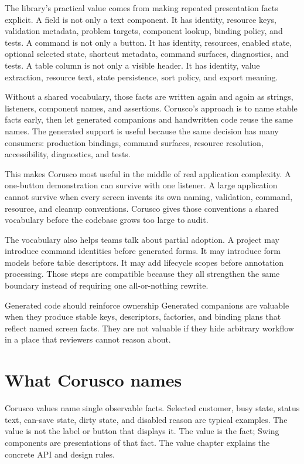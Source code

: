 The library's practical value comes from making repeated presentation facts explicit. A field is not only a text component. It has identity, resource keys, validation metadata, problem targets, component lookup, binding policy, and tests. A command is not only a button. It has identity, resources, enabled state, optional selected state, shortcut metadata, command surfaces, diagnostics, and tests. A table column is not only a visible header. It has identity, value extraction, resource text, state persistence, sort policy, and export meaning.

Without a shared vocabulary, those facts are written again and again as strings, listeners, component names, and assertions. Corusco's approach is to name stable facts early, then let generated companions and handwritten code reuse the same names. The generated support is useful because the same decision has many consumers: production bindings, command surfaces, resource resolution, accessibility, diagnostics, and tests.

This makes Corusco most useful in the middle of real application complexity. A one-button demonstration can survive with one listener. A large application cannot survive when every screen invents its own naming, validation, command, resource, and cleanup conventions. Corusco gives those conventions a shared vocabulary before the codebase grows too large to audit.

The vocabulary also helps teams talk about partial adoption. A project may introduce command identities before generated forms. It may introduce form models before table descriptors. It may add lifecycle scopes before annotation processing. Those steps are compatible because they all strengthen the same boundary instead of requiring one all-or-nothing rewrite.

\begin{principlebox}{Generated code should reinforce ownership}
Generated companions are valuable when they produce stable keys, descriptors, factories, and binding plans that reflect named screen facts. They are not valuable if they hide arbitrary workflow in a place that reviewers cannot reason about.
\end{principlebox}

\section{What Corusco names}

Corusco values name single observable facts. Selected customer, busy state, status text, can-save state, dirty state, and disabled reason are typical examples. The value is not the label or button that displays it. The value is the fact; Swing components are presentations of that fact. The value chapter explains the concrete API and design rules.

